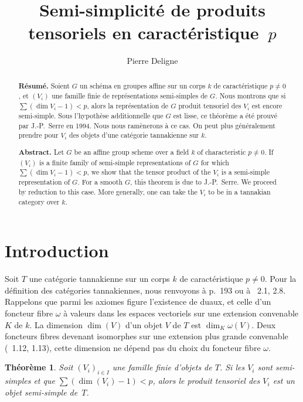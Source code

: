 \documentclass[11pt,a4paper]{article}
\theoremstyle{plain}
\newtheorem{theorem}{Th\'eor\`eme}[section]
\theoremstyle{definition}
\begin{document}
\title{Semi-simplicit\'e de produits tensoriels en caract\'eristique~$p$}
\author{Pierre Deligne}
\date{}
\maketitle

\begin{abstract}
\noindent\textbf{R\'esum\'e.}
Soient $G$ un sch\'ema en groupes affine sur un corps $k$ de caract\'eristique $p \neq 0$, et $(V_i)$ une famille finie de repr\'esentations semi-simples de $G$. Nous montrons que si $\sum (\dim V_i - 1) < p$, alors la repr\'esentation de $G$ produit tensoriel des $V_i$ est encore semi-simple. Sous l'hypoth\`ese additionnelle que $G$ est lisse, ce th\'eor\`eme a \'et\'e prouv\'e par J.-P.\ Serre en 1994. Nous nous ram\`enerons \`a ce cas. On peut plus g\'en\'eralement prendre pour $V_i$ des objets d'une cat\'egorie tannakienne sur $k$.

\medskip\noindent\textbf{Abstract.}
Let $G$ be an affine group scheme over a field $k$ of characteristic $p \neq 0$. If $(V_i)$ is a finite family of semi-simple representations of $G$ for which $\sum (\dim V_i - 1) < p$, we show that the tensor product of the $V_i$ is a semi-simple representation of $G$. For a smooth $G$, this theorem is due to J.-P.\ Serre. We proceed by reduction to this case. More generally, one can take the $V_i$ to be in a tannakian category over $k$.
\end{abstract}

\section{Introduction}\label{sec:0}

Soit $T$ une cat\'egorie tannakienne sur un corps $k$ de caract\'eristique $p \neq 0$. Pour la d\'efinition des cat\'egories tannakiennes, nous renvoyons \`a \cite{Saavedra} p.~193 ou \`a \cite{Deligne1990}~2.1, 2.8. Rappelons que parmi les axiomes figure l'existence de duaux, et celle d'un foncteur fibre $\omega$ \`a valeurs dans les espaces vectoriels sur une extension convenable $K$ de $k$. La dimension $\dim(V)$ d'un objet $V$ de $T$ est $\dim_K \omega(V)$. Deux foncteurs fibres devenant isomorphes sur une extension plus grande convenable (\cite{Deligne1990}~1.12, 1.13), cette dimension ne d\'epend pas du choix du foncteur fibre $\omega$.

\begin{theorem}\label{thm:0.1}
Soit $(V_i)_{i \in I}$ une famille finie d'objets de $T$. Si les $V_i$ sont semi-simples et que $\sum (\dim(V_i) - 1) < p$, alors le produit tensoriel des $V_i$ est un objet semi-simple de~$T$.
\end{theorem}
\end{document}
